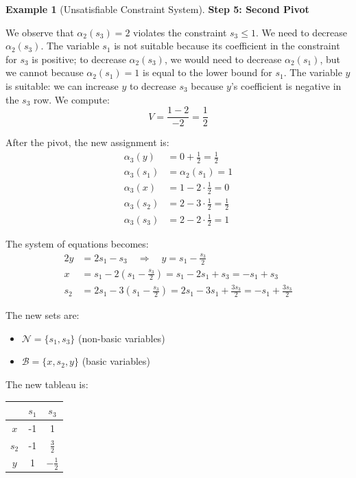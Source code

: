 \documentclass[11pt,a4paper]{article}
\theoremstyle{definition}
\newtheorem{example}{Example}[section]
\theoremstyle{plain}
\theoremstyle{remark}
\begin{document}
\begin{example}[Unsatisfiable Constraint System]
    \textbf{Step 5: Second Pivot}
    
    We observe that $\alpha_2(s_3) = 2$ violates the constraint $s_3 \leq 1$. We need to decrease $\alpha_2(s_3)$. The variable $s_1$ is not suitable because its coefficient in the constraint for $s_3$ is positive; to decrease $\alpha_2(s_3)$, we would need to decrease $\alpha_2(s_1)$, but we cannot because $\alpha_2(s_1) = 1$ is equal to the lower bound for $s_1$. The variable $y$ is suitable: we can increase $y$ to decrease $s_3$ because $y$'s coefficient is negative in the $s_3$ row. We compute:
    \[
        V = \frac{1 - 2}{-2} = \frac{1}{2}
    \]
    
    After the pivot, the new assignment is:
    \begin{align*}
        \alpha_3(y) &= 0 + \frac{1}{2} = \frac{1}{2} \\
        \alpha_3(s_1) &= \alpha_2(s_1) = 1 \\
        \alpha_3(x) &= 1 - 2 \cdot \frac{1}{2} = 0 \\
        \alpha_3(s_2) &= 2 - 3 \cdot \frac{1}{2} = \frac{1}{2} \\
        \alpha_3(s_3) &= 2 - 2 \cdot \frac{1}{2} = 1
    \end{align*}
    
    The system of equations becomes:
    \begin{align*}
        2y &= 2s_1 - s_3 \quad \Rightarrow \quad y = s_1 - \frac{s_3}{2} \\
        x &= s_1 - 2\left(s_1 - \frac{s_3}{2}\right) = s_1 - 2s_1 + s_3 = -s_1 + s_3 \\
        s_2 &= 2s_1 - 3\left(s_1 - \frac{s_3}{2}\right) = 2s_1 - 3s_1 + \frac{3s_3}{2} = -s_1 + \frac{3s_3}{2}
    \end{align*}
    
    The new sets are:
    \begin{itemize}
        \item $\mathcal{N} = \{s_1, s_3\}$ (non-basic variables)
        \item $\mathcal{B} = \{x, s_2, y\}$ (basic variables)
    \end{itemize}
    
    The new tableau is:
    
    \begin{center}
    \begin{tabular}{c|cc}
        & $s_1$ & $s_3$ \\
        \hline
        $x$ & -1 & 1 \\
        $s_2$ & -1 & $\frac{3}{2}$ \\
        $y$ & 1 & $-\frac{1}{2}$
    \end{tabular}
    \end{center}
    

\end{example}
\end{document}
